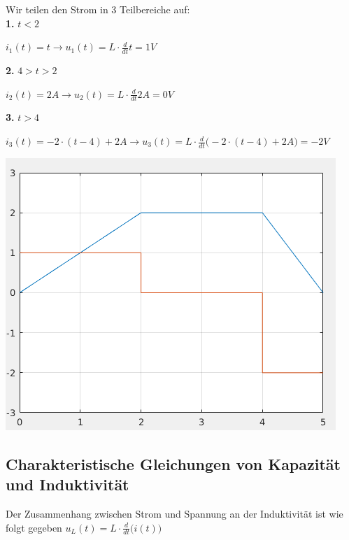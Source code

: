 \iend


\newpage


\beginbsp
Wir teilen den Strom in 3 Teilbereiche auf: \\
\textbf{1.} $t < 2$
\begin{center}

	$ i_1(t) = t \rightarrow u_1(t) = L \cdot \frac{d}{dt} t = 1V $
\end{center}
\textbf{2.} $ 4 > t > 2$
\begin{center}

	$ i_2(t) = 2A \rightarrow u_2(t) = L \cdot \frac{d}{dt} 2 A = 0V$
\end{center}

\textbf{3.} $t > 4$
\begin{center}

	$ i_3(t) = -2 \cdot (t-4) + 2A \rightarrow u_3(t) = L \cdot \frac{d}{dt} \big( -2 \cdot (t-4) + 2A \big) = -2 V$
\end{center}
\begin{center}
	\includegraphics[scale=0.5]{img/selbstind-a1-lsg}
\end{center}
\iend



\newpage


\subsection{Charakteristische Gleichungen von Kapazität und Induktivität}
\begingl
Der Zusammenhang zwischen Strom und Spannung an der Induktivität ist wie folgt gegeben
\formulaBegin
$\displaystyle u_L(t) = L \cdot \frac{d}{dt}\big( i(t) \big)$

